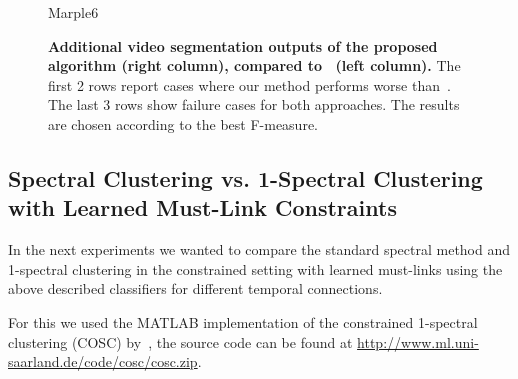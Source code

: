 \begin{figure}[htbp]
\begin{minipage}[t]{1\textwidth}
\end{minipage}
\begin{minipage}[t]{1\textwidth}
\centering
\footnotesize Marple6%

\end{minipage}
 \caption[Additional video segmentation outputs of the proposed algorithm, compared to~\cite{GalassoCS12}]{
  {\bf Additional video segmentation outputs of the proposed algorithm (right column), compared to~\cite{GalassoCS12} (left column).} The first 2 rows report cases where our method performs worse than~\cite{GalassoCS12}.
The last 3 rows show failure cases for both approaches. The results are chosen according to the best F-measure.}
\label{fig:seg_res_sc_bad}
\end{figure}
\subsection{Spectral Clustering vs. 1-Spectral Clustering with Learned Must-Link Constraints}
In the next experiments we wanted to compare the standard spectral method and 1-spectral clustering in the constrained setting with learned must-links using the above
described classifiers for different temporal connections. 

For this we used the MATLAB implementation of the constrained 1-spectral clustering (COSC) by~\cite{RangapuramH12}, the source code can be found at
\url{http://www.ml.uni-saarland.de/code/cosc/cosc.zip}. 

